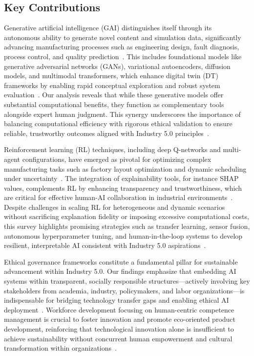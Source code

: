 \documentclass[sigconf]{acmart}
\begin{document}
\subsection{Key Contributions}

Generative artificial intelligence (GAI) distinguishes itself through its autonomous ability to generate novel content and simulation data, significantly advancing manufacturing processes such as engineering design, fault diagnosis, process control, and quality prediction~\cite{ref1,ref5,ref24}. This includes foundational models like generative adversarial networks (GANs), variational autoencoders, diffusion models, and multimodal transformers, which enhance digital twin (DT) frameworks by enabling rapid conceptual exploration and robust system evaluation~\cite{ref2,ref3}. Our analysis reveals that while these generative models offer substantial computational benefits, they function as complementary tools alongside expert human judgment. This synergy underscores the importance of balancing computational efficiency with rigorous ethical validation to ensure reliable, trustworthy outcomes aligned with Industry 5.0 principles~\cite{ref2,ref6,ref14}.

Reinforcement learning (RL) techniques, including deep Q-networks and multi-agent configurations, have emerged as pivotal for optimizing complex manufacturing tasks such as factory layout optimization and dynamic scheduling under uncertainty~\cite{ref5,ref30}. The integration of explainability tools, for instance SHAP values, complements RL by enhancing transparency and trustworthiness, which are critical for effective human-AI collaboration in industrial environments~\cite{ref30}. Despite challenges in scaling RL for heterogeneous and dynamic scenarios without sacrificing explanation fidelity or imposing excessive computational costs, this survey highlights promising strategies such as transfer learning, sensor fusion, autonomous hyperparameter tuning, and human-in-the-loop systems to develop resilient, interpretable AI consistent with Industry 5.0 aspirations~\cite{ref5,ref30,ref35,ref36}.

Ethical governance frameworks constitute a fundamental pillar for sustainable advancement within Industry 5.0. Our findings emphasize that embedding AI systems within transparent, socially responsible structures—actively involving key stakeholders from academia, industry, policymakers, and labor organizations—is indispensable for bridging technology transfer gaps and enabling ethical AI deployment~\cite{ref3,ref25,ref38}. Workforce development focusing on human-centric competence management is crucial to foster innovation and promote eco-oriented product development, reinforcing that technological innovation alone is insufficient to achieve sustainability without concurrent human empowerment and cultural transformation within organizations~\cite{ref14,ref19,ref21}.
\end{document}
